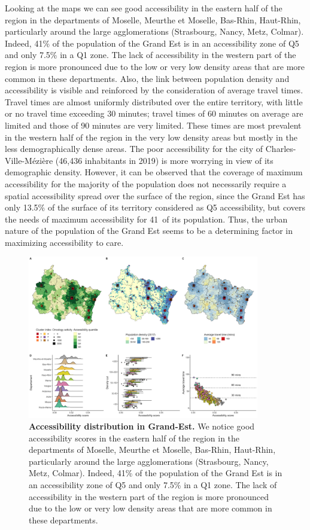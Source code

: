 Looking at the maps we can see good accessibility in the eastern half of the
region in the departments of Moselle, Meurthe et Moselle, Bas-Rhin, Haut-Rhin,
particularly around the large agglomerations (Strasbourg, Nancy, Metz, Colmar).
Indeed, 41\% of the population of the Grand Est is in an accessibility zone of
Q5 and only 7.5\% in a Q1 zone. The lack of accessibility in the western part of
the region is more pronounced due to the low or very low density areas that are
more common in these departments. Also, the link between population density and
accessibility is visible and reinforced by the consideration of average travel
times. Travel times are almost uniformly distributed over the entire territory,
with little or no travel time exceeding 30 minutes; travel times of 60 minutes
on average are limited and those of 90 minutes are very limited. These times are
most prevalent in the western half of the region in the very low density areas
but mostly in the less demographically dense areas.  The poor accessibility for
the city of Charles-Ville-Mézière (46,436 inhabitants in 2019) is more worrying
in view of its demographic density. However, it can be observed that the
coverage of maximum accessibility for the majority of the population does not
necessarily require a spatial accessibility spread over the surface of the
region, since the Grand Est has only 13.5\% of the surface of its territory
considered as Q5 accessibility, but covers the needs of maximum accessibility
for 41\ of its population. Thus, the urban nature of the population of the Grand
Est seems to be a determining factor in maximizing accessibility to care.

\begin{figure}[H]
    \includegraphics[width=0.9\textwidth]{images/camion/region_accessibility/accessibility_Grand-Est.png}
    \centering
    \caption{ \textbf{Accessibility distribution in Grand-Est.} We notice good
        accessibility scores in the eastern half of the region in the
        departments of Moselle, Meurthe et Moselle, Bas-Rhin, Haut-Rhin,
        particularly around the large agglomerations (Strasbourg, Nancy, Metz,
        Colmar). Indeed, 41\% of the population of the Grand Est is in an
        accessibility zone of Q5 and only 7.5\% in a Q1 zone. The lack of
        accessibility in the western part of the region is more pronounced due
        to the low or very low density areas that are more common in these
        departments. }
\end{figure}


